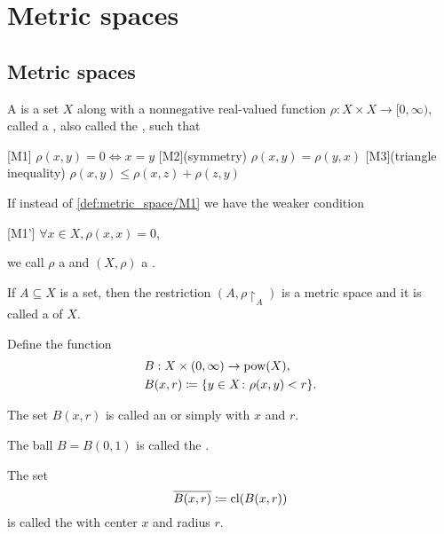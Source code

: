 \section{Metric spaces}\label{sec:metric_spaces}
\subsection{Metric spaces}\label{subsec:metric_spaces}

\begin{definition}\label{def:metric_space}\cite[248]{Engelking1989}
  A  is a set \( X \) along with a nonnegative real-valued function \( \rho: X \times X \to [0, \infty) \), called a , also called the , such that
  \begin{defenum}[series=def:metric_space]
    [M1] \( \rho(x, y) = 0 \iff x = y \)
    [M2](symmetry) \( \rho(x, y) = \rho(y, x) \)
    [M3](triangle inequality) \( \rho(x, y) \leq \rho(x, z) + \rho(z, y) \)
  \end{defenum}

  If instead of \ref{def:metric_space/M1} we have the weaker condition
  \begin{defenum}[resume=def:metric_space]
    [M1'] \( \forall x \in X, \rho(x, x) = 0 \),
  \end{defenum}
  we call \( \rho \) a  and \( (X, \rho) \) a .

  \begin{defenum}
     If \( A \subseteq X \) is a set, then the restriction \( (A, \rho{\restriction_A}) \) is a metric space and it is called a  of $X$.

     Define the function
    \begin{align*}
      &B: X \times (0, \infty) \to \operatorname{pow}(X), \\
      &B(x, r) \coloneqq \{ y \in X \colon \rho(x, y) < r \}.
    \end{align*}

    The set \( B(x, r) \) is called an  or simply  with  \( x \) and  \( r \).

    The ball \( B = B(0, 1) \) is called the .

     The set
    \begin{equation*}
      \overline{B(x, r)} \coloneqq \operatorname{cl}(B(x, r))
    \end{equation*}
    is called the  with center \( x \) and radius \( r \).


\end{defenum}
\end{definition}
